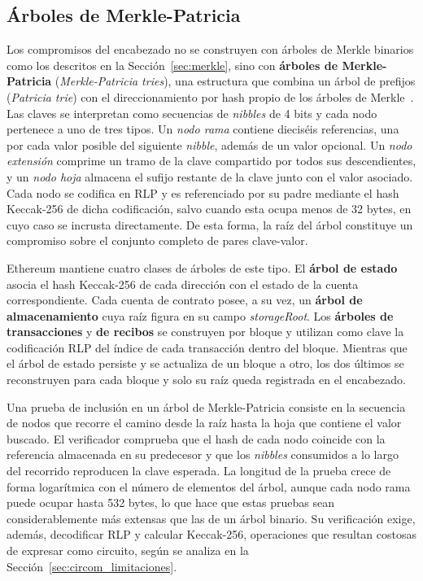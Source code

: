 \subsection{Árboles de Merkle-Patricia}
\label{sec:eth_mpt}

Los compromisos del encabezado no se construyen con árboles de Merkle binarios como los descritos
en la Sección~\ref{sec:merkle}, sino con \textbf{árboles de Merkle-Patricia}
(\textit{Merkle-Patricia tries}), una estructura que combina un árbol de prefijos
(\textit{Patricia trie}) con el direccionamiento por hash propio de los árboles de
Merkle~\cite{wood2014ethereum}. Las claves se interpretan como secuencias de \textit{nibbles} de
4 bits y cada nodo pertenece a uno de tres tipos. Un \textit{nodo rama} contiene dieciséis
referencias, una por cada valor posible del siguiente \textit{nibble}, además de un valor
opcional. Un \textit{nodo extensión} comprime un tramo de la clave compartido por todos sus
descendientes, y un \textit{nodo hoja} almacena el sufijo restante de la clave junto con el valor
asociado. Cada nodo se codifica en RLP y es referenciado por su padre mediante el hash
Keccak-256 de dicha codificación, salvo cuando esta ocupa menos de 32 bytes, en cuyo caso se
incrusta directamente. De esta forma, la raíz del árbol constituye un compromiso sobre el
conjunto completo de pares clave-valor.

Ethereum mantiene cuatro clases de árboles de este tipo. El \textbf{árbol de estado} asocia el
hash Keccak-256 de cada dirección con el estado de la cuenta correspondiente. Cada cuenta de
contrato posee, a su vez, un \textbf{árbol de almacenamiento} cuya raíz figura en su campo
\textit{storageRoot}. Los \textbf{árboles de transacciones} y \textbf{de recibos} se construyen
por bloque y utilizan como clave la codificación RLP del índice de cada transacción dentro del
bloque. Mientras que el árbol de estado persiste y se actualiza de un bloque a otro, los dos
últimos se reconstruyen para cada bloque y solo su raíz queda registrada en el encabezado.

Una prueba de inclusión en un árbol de Merkle-Patricia consiste en la secuencia de nodos que
recorre el camino desde la raíz hasta la hoja que contiene el valor buscado. El verificador
comprueba que el hash de cada nodo coincide con la referencia almacenada en su predecesor y que
los \textit{nibbles} consumidos a lo largo del recorrido reproducen la clave esperada. La
longitud de la prueba crece de forma logarítmica con el número de elementos del árbol, aunque
cada nodo rama puede ocupar hasta 532 bytes, lo que hace que estas pruebas sean
considerablemente más extensas que las de un árbol binario. Su verificación exige, además,
decodificar RLP y calcular Keccak-256, operaciones que resultan costosas de expresar como
circuito, según se analiza en la Sección~\ref{sec:circom_limitaciones}.

